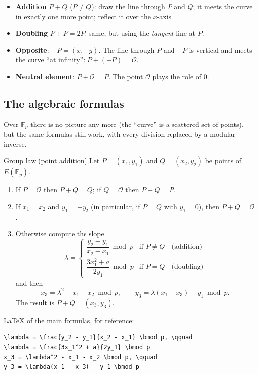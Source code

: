 \begin{itemize}
  \item \textbf{Addition} $P + Q$ ($P \neq Q$): draw the line through $P$ and $Q$; it meets the curve in exactly one more point; reflect it over the $x$-axis.
  \item \textbf{Doubling} $P + P = 2P$: same, but using the \textit{tangent} line at $P$.
  \item \textbf{Opposite}: $-P = (x, -y)$. The line through $P$ and $-P$ is vertical and meets the curve ``at infinity'': $P + (-P) = \mathcal{O}$.
  \item \textbf{Neutral element}: $P + \mathcal{O} = P$. The point $\mathcal{O}$ plays the role of $0$.
\end{itemize}

\subsection{The algebraic formulas}

Over $\mathbb{F}_p$ there is no picture any more (the ``curve'' is a scattered set of points), but the same formulas still work, with every division replaced by a modular inverse.

\begin{framedprop}[label={prop:grouplaw}]{Group law (point addition)}
  Let $P = (x_1, y_1)$ and $Q = (x_2, y_2)$ be points of $E(\mathbb{F}_p)$.
  \begin{enumerate}
    \item If $P = \mathcal{O}$ then $P + Q = Q$; if $Q = \mathcal{O}$ then $P + Q = P$.
    \item If $x_1 = x_2$ and $y_1 = -y_2$ (in particular, if $P = Q$ with $y_1 = 0$), then $P + Q = \mathcal{O}$.
    \item Otherwise compute the slope
    \[
      \lambda =
      \begin{cases}
        \dfrac{y_2 - y_1}{x_2 - x_1} \bmod p & \text{if } P \neq Q \quad \text{(addition)}\\[2ex]
        \dfrac{3x_1^2 + a}{2 y_1} \bmod p & \text{if } P = Q \quad \text{(doubling)}
      \end{cases}
    \]
    and then
    \[
      x_3 = \lambda^2 - x_1 - x_2 \bmod p, \qquad y_3 = \lambda (x_1 - x_3) - y_1 \bmod p .
    \]
    The result is $P + Q = (x_3, y_3)$.
  \end{enumerate}
\end{framedprop}

LaTeX of the main formulas, for reference:
\begin{lstlisting}[numbers=none]
\lambda = \frac{y_2 - y_1}{x_2 - x_1} \bmod p, \qquad
\lambda = \frac{3x_1^2 + a}{2y_1} \bmod p
x_3 = \lambda^2 - x_1 - x_2 \bmod p, \qquad
y_3 = \lambda(x_1 - x_3) - y_1 \bmod p\end{lstlisting}

